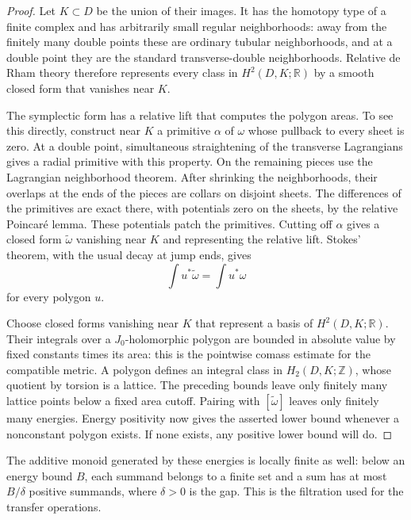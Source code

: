 \documentclass[11pt]{article}
\numberwithin{equation}{section}
\theoremstyle{definition}
\theoremstyle{remark}
\begin{document}
\begin{proof}
Let $K\subset D$ be the union of their images.  It has the homotopy
type of a finite complex and has arbitrarily small regular
neighborhoods: away from the finitely many double points these are
ordinary tubular neighborhoods, and at a double point they are the
standard transverse-double neighborhoods.  Relative de Rham theory
therefore represents every class in $H^2(D,K;\mathbb R)$ by a smooth closed
form that vanishes near $K$.

The symplectic form has a relative lift that computes the polygon
areas.  To see this directly, construct near $K$ a primitive $\alpha$
of $\omega$ whose pullback to every sheet is zero.  At a double point,
simultaneous straightening of the transverse Lagrangians gives a radial
primitive with this property.  On the remaining pieces use the
Lagrangian neighborhood theorem.  After shrinking the neighborhoods,
their overlaps at the ends of the pieces are collars on disjoint
sheets.  The differences of the primitives are exact there, with
potentials zero on the sheets, by the relative Poincar\'e lemma.
These potentials patch the primitives.  Cutting off $\alpha$ gives a
closed form $\widetilde\omega$ vanishing near $K$ and representing the
relative lift.  Stokes' theorem, with the usual decay at jump ends,
gives
\[
 \int u^*\widetilde\omega=\int u^*\omega
\]
for every polygon $u$.

Choose closed forms vanishing near $K$ that represent a basis of
$H^2(D,K;\mathbb R)$.  Their integrals over a $J_0$-holomorphic polygon are
bounded in absolute value by fixed constants times its area: this is
the pointwise comass estimate for the compatible metric.  A polygon
defines an integral class in $H_2(D,K;\mathbb Z)$, whose quotient by torsion
is a lattice.  The preceding bounds leave only finitely many lattice
points below a fixed area cutoff.  Pairing with
$[\widetilde\omega]$ leaves only finitely many energies.  Energy
positivity now gives the asserted lower bound whenever a nonconstant
polygon exists.  If none exists, any positive lower bound will do.
\end{proof}

The additive monoid generated by these energies is locally finite as
well: below an energy bound $B$, each summand belongs to a finite set
and a sum has at most $B/\delta$ positive summands, where $\delta>0$
is the gap.  This is the filtration used for the transfer operations.
\end{document}
